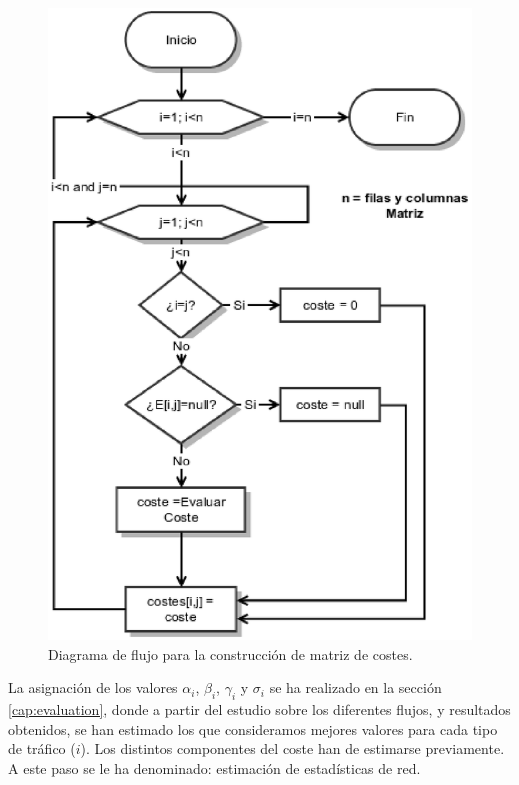 \documentclass[a4paper,11pt]{book}
\begin{document}
\begin{enumerate}
\begin{figure}[tb]
\centering
\includegraphics[scale=0.7]{./figuras/matrizCoste}
\caption{Diagrama de flujo para la construcción de matriz de costes.}\label{matrizCoste}
\end{figure}

\end{enumerate}

La asignación de los valores $\alpha_i$, $\beta_i$, $\gamma_i$ y $\sigma_i$ se ha realizado en la sección \ref{cap:evaluation}, donde a partir del estudio sobre los diferentes flujos, y resultados obtenidos, se han estimado los que consideramos mejores valores para cada tipo de tráfico ($i$). Los distintos componentes del coste han de estimarse previamente. A este paso se le ha denominado: estimación de estadísticas de red.  
\end{document}
